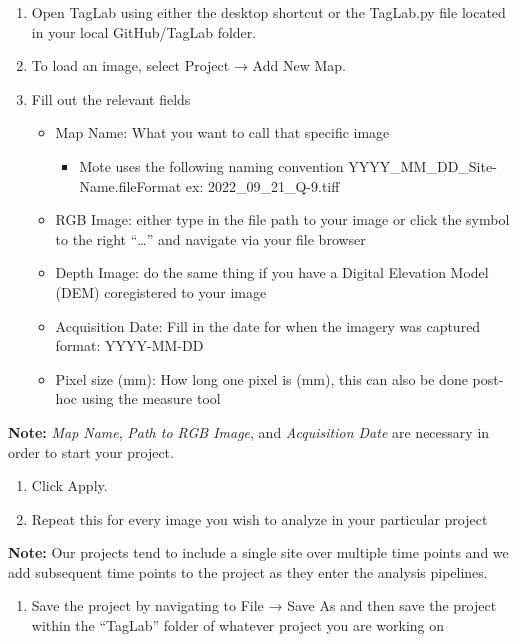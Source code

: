 \documentclass[
]{article}
\providecommand{\tightlist}{%
  \setlength{\itemsep}{0pt}\setlength{\parskip}{0pt}}
\begin{document}
\begin{enumerate}
\def\labelenumi{\arabic{enumi}.}
\item
  Open TagLab using either the desktop shortcut or the TagLab.py file
  located in your local GitHub/TagLab folder.
\item
  To load an image, select Project → Add New Map.
\item
  Fill out the relevant fields

  \begin{itemize}
  \tightlist
  \item
    Map Name: What you want to call that specific image

    \begin{itemize}
    \tightlist
    \item
      Mote uses the following naming convention
      YYYY\_MM\_DD\_Site-Name.fileFormat ex: 2022\_09\_21\_Q-9.tiff
    \end{itemize}
  \item
    RGB Image: either type in the file path to your image or click the
    symbol to the right ``\ldots{}'' and navigate via your file browser
  \item
    Depth Image: do the same thing if you have a Digital Elevation Model
    (DEM) coregistered to your image
  \item
    Acquisition Date: Fill in the date for when the imagery was captured
    format: YYYY-MM-DD
  \item
    Pixel size (mm): How long one pixel is (mm), this can also be done
    post-hoc using the measure tool
  \end{itemize}
\end{enumerate}

\textbf{Note:} \emph{Map Name}, \emph{Path to RGB Image}, and
\emph{Acquisition Date} are necessary in order to start your project.

\begin{enumerate}
\def\labelenumi{\arabic{enumi}.}
\setcounter{enumi}{3}
\item
  Click Apply.
\item
  Repeat this for every image you wish to analyze in your particular
  project
\end{enumerate}

\textbf{Note:} Our projects tend to include a single site over multiple
time points and we add subsequent time points to the project as they
enter the analysis pipelines.

\begin{enumerate}
\def\labelenumi{\arabic{enumi}.}
\setcounter{enumi}{5}
\tightlist
\item
  Save the project by navigating to File → Save As and then save the
  project within the ``TagLab'' folder of whatever project you are
  working on
\end{enumerate}
\end{document}
